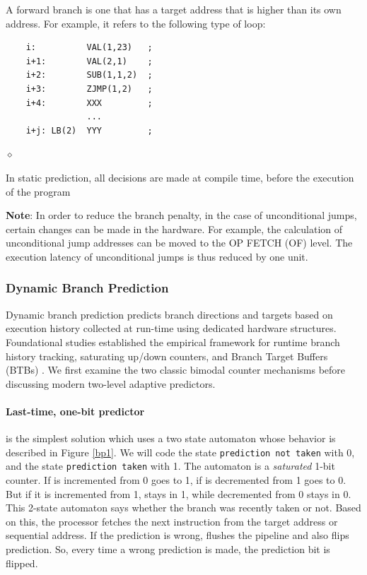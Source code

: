 \begin{exemplu}
A forward branch is one that has a target address that is higher than its own address. For example,
it  refers to the following type of loop:
\begin{verbatim}
    i:          VAL(1,23)   ;
    i+1:        VAL(2,1)    ;
    i+2:        SUB(1,1,2)  ;
    i+3:        ZJMP(1,2)   ;
    i+4:        XXX         ;
                ...
    i+j: LB(2)  YYY         ;
\end{verbatim}


$\diamond$
\end{exemplu}

In static prediction, all decisions are made at compile time, before the execution of the program

{\bf Note}: In order to reduce the branch penalty, in the case of unconditional jumps, certain changes can be made in the hardware. For example, the calculation of unconditional jump addresses can be moved to the OP FETCH (OF) level. The execution latency of unconditional jumps is thus reduced by one unit.

\subsubsection{Dynamic Branch Prediction}

Dynamic branch prediction predicts branch directions and targets based on execution history collected at run-time using dedicated hardware structures. Foundational studies established the empirical framework for runtime branch history tracking, saturating up/down counters, and Branch Target Buffers (BTBs) \cite{smith1981study, lee1984branch}. We first examine the two classic bimodal counter mechanisms before discussing modern two-level adaptive predictors.

\paragraph{Last-time, one-bit predictor}
is the simplest solution  which uses a two state automaton whose behavior is described in Figure \ref{bp1}. We will code the state {\tt prediction not taken} with 0, and the state {\tt prediction taken} with 1. The automaton is a {\em saturated} 1-bit counter. If is incremented from 0 goes to 1, if is decremented from 1 goes to 0. But if it is incremented from 1, stays in 1, while decremented from 0 stays in 0. This 2-state automaton says whether the branch was recently taken or not. Based on this, the processor fetches the next instruction from the target address or sequential address. If the prediction is wrong, flushes the pipeline and also flips prediction. So, every time a wrong prediction is made, the prediction bit is flipped.

